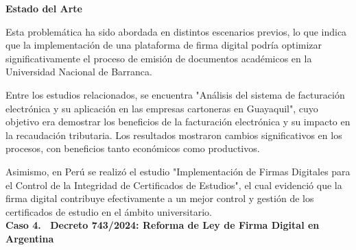 \documentclass[a4paper,12pt]{article}
\begin{document}
{\small {\selectfont \textbf{	Estado del Arte}}}

{\small {\selectfont 	Esta problemática ha sido abordada en distintos escenarios previos, lo que indica que la implementación de una plataforma de firma digital podría optimizar significativamente el proceso de emisión de documentos académicos en la Universidad Nacional de Barranca.}}

{\small {\selectfont 	Entre los estudios relacionados, se encuentra "Análisis del sistema de facturación electrónica y su aplicación en las empresas cartoneras en Guayaquil", cuyo objetivo era demostrar los beneficios de la facturación electrónica y su impacto en la recaudación tributaria. Los resultados mostraron cambios significativos en los procesos, con beneficios tanto económicos como productivos.}}

{\small {\selectfont 	Asimismo, en Perú se realizó el estudio "Implementación de Firmas Digitales para el Control de la Integridad de Certificados de Estudios", el cual evidenció que la firma digital contribuye efectivamente a un mejor control y gestión de los certificados de estudio en el ámbito universitario.}}\\





\textbf{{\selectfont Caso 4. \ Decreto 743/2024: Reforma de Ley de Firma Digital en Argentina}}

	{\selectfont {\small En la actualidad, la digitalización de documentos y trámites administrativos ha ganado gran relevancia a nivel global, especialmente en el area gubernamental. Las firmas digitales se ha convertido en una herramienta clave para garantizar autenticidad, integridad y validez legal de documentos electrónicos, a su vez facilitando los procesos de trámites de manera segura y eficiente. Bajo este contexto, Argentina recientemente ha implementado regulaciones específicas para propiciar el uso de las firmas digitales tanto en el sector público como en el sector privado.}}



\textbf{{\selectfont {\small 	Marco Teorico}}}
\end{document}
